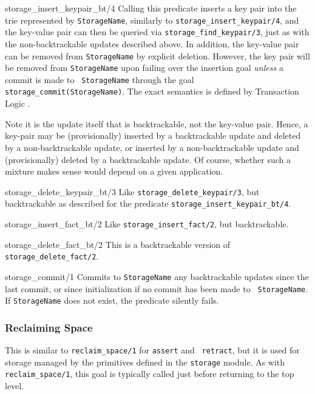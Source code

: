 \begin{description}
{storage\_insert\_keypair\_bt/4}
Calling this predicate inserts a key pair into the trie
represented by {\tt StorageName},
similarly to
\texttt{storage\_insert\_keypair/4}, and the key-value pair can then be
queried via {\tt storage\_find\_keypair/3}, just as with the
non-backtrackable updates described above.  In addition, the key-value
pair can be removed from {\tt StorageName} by explicit deletion.
However, the key pair will be removed from {\tt StorageName} upon
failing over the insertion goal {\em unless} a commit is made to {\tt
  StorageName} through the goal {\tt storage\_commit(StorageName)}.
The exact semantics is defined by Transaction Logic \cite{BoKi94}.

Note it is the update itself that is backtrackable, not the key-value
pair.  Hence, a key-pair may be (provisionally) inserted by a
backtrackable update and deleted by a non-backtrackable update, or
inserted by a non-backtrackable update and (provisionally) deleted by
a backtrackable update.  Of course, whether such a mixture makes sense
would depend on a given application.

{storage\_delete\_keypair\_bt/3}
Like {\tt storage\_delete\_keypair/3}, but backtrackable as described
for the predicate \texttt{storage\_insert\_keypair\_bt/4}.

 {storage\_insert\_fact\_bt/2}
Like {\tt storage\_insert\_fact/2}, but backtrackable.

{storage\_delete\_fact\_bt/2}
This is a backtrackable version of {\tt storage\_delete\_fact/2}.

 {storage\_commit/1}
Commits to {\tt StorageName} any backtrackable updates since the last
commit, or since initialization if no commit has been made to {\tt
  StorageName}.  If {\tt StorageName} does not exist, the predicate
silently fails.
\end{description}
\subsubsection{Reclaiming Space}
\begin{description}
This is similar to {\tt reclaim\_space/1} for {\tt assert} and {\tt
  retract}, but it is used for storage managed by the primitives defined in
the {\tt storage} module. As with {\tt reclaim\_space/1}, this goal is
typically called just before returning to the top level.
\end{description}



